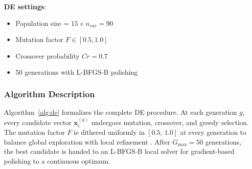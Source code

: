 \documentclass[12pt, a4paper]{article}
\begin{document}
\textbf{DE settings}:
\begin{itemize}[leftmargin=*]
    \item Population size = $15 \times n_{var} = 90$
    \item Mutation factor $F \in [0.5, 1.0]$
    \item Crossover probability $Cr = 0.7$
    \item 50 generations with L-BFGS-B polishing
\end{itemize}

\subsubsection{Algorithm Description}

\hspace{1cm}Algorithm~\ref{alg:de} formalizes the complete DE procedure. At each generation $g$, every candidate vector $\mathbf{x}_i^{(g)}$ undergoes mutation, crossover, and greedy selection. The mutation factor $F$ is dithered uniformly in $[0.5,\,1.0]$ at every generation to balance global exploration with local refinement \cite{storn1997}. After $G_{\max}=50$ generations, the best candidate is handed to an L-BFGS-B local solver for gradient-based polishing to a continuous optimum.
\end{document}
